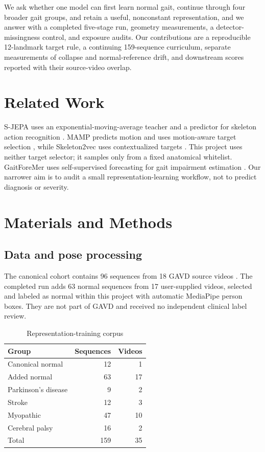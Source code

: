 \documentclass[conference]{IEEEtran}
\begin{document}
We ask whether one model can first learn normal gait, continue through four broader gait groups, and retain a useful, nonconstant representation, and we answer with a completed five-stage run, geometry measurements, a detector-missingness control, and exposure audits. Our contributions are a reproducible 12-landmark target rule, a continuing 159-sequence curriculum, separate measurements of collapse and normal-reference drift, and downstream scores reported with their source-video overlap.

\section{Related Work}
S-JEPA uses an exponential-moving-average teacher and a predictor for skeleton action recognition \cite{abdelfattah2024sjepa}. MAMP predicts motion and uses motion-aware target selection \cite{mao2023mamp}, while Skeleton2vec uses contextualized targets \cite{xu2024skeleton2vec}. This project uses neither target selector; it samples only from a fixed anatomical whitelist. GaitForeMer uses self-supervised forecasting for gait impairment estimation \cite{endo2022gaitforemer}. Our narrower aim is to audit a small representation-learning workflow, not to predict diagnosis or severity.

\section{Materials and Methods}
\subsection{Data and pose processing}
The canonical cohort contains 96 sequences from 18 GAVD source videos \cite{ranjan2025gavd}. The completed run adds 63 normal sequences from 17 user-supplied videos, selected and labeled as normal within this project with automatic MediaPipe person boxes. They are not part of GAVD and received no independent clinical label review.

\begin{table}[t]
\caption{Representation-training corpus}
\label{tab:cohort}
\centering
\scriptsize
\begin{tabular}{lrr}
\toprule
Group & Sequences & Videos \\
\midrule
Canonical normal & 12 & 1 \\
Added normal & 63 & 17 \\
Parkinson's disease & 9 & 2 \\
Stroke & 12 & 3 \\
Myopathic & 47 & 10 \\
Cerebral palsy & 16 & 2 \\
\midrule
Total & 159 & 35 \\
\bottomrule
\end{tabular}
\end{table}
\end{document}
